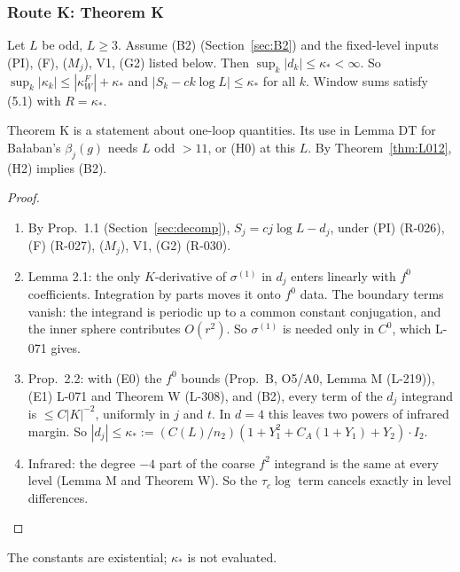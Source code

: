 \subsubsection{Route K: Theorem K}\label{sec:routeK}

\begin{theorem}[Theorem K]\label{thm:L009}
Let $L$ be odd, $L\ge3$. Assume (B2) (Section~\ref{sec:B2}) and the fixed-level inputs (PI), (F), ($M_j$), V1, (G2) listed below. Then $\sup_k|d_k|\le\kappa_*<\infty$. So $\sup_k|\kappa_k|\le|\kappa_W^F|+\kappa_*$ and $|S_k-ck\log L|\le\kappa_*$ for all $k$. Window sums satisfy (5.1) with $R=\kappa_*$.
\end{theorem}
Theorem K is a statement about one-loop quantities. Its use in Lemma DT for Ba{\l}aban's $\beta_j(g)$ needs $L$ odd $>11$, or (H0) at this $L$. By Theorem~\ref{thm:L012}, (H2) implies (B2).

\begin{proof}
\begin{enumerate}
\item By  Prop.\ 1.1 (Section~\ref{sec:decomp}), $S_j=cj\log L-d_j$, under (PI) (R-026), (F) (R-027), ($M_j$), V1, (G2) (R-030).
\item Lemma 2.1: the only $K$-derivative of $\sigma^{(1)}$ in $d_j$ enters linearly with $f^0$ coefficients. Integration by parts moves it onto $f^0$ data. The boundary terms vanish: the integrand is periodic up to a common constant conjugation, and the inner sphere contributes $O(r^2)$. So $\sigma^{(1)}$ is needed only in $C^0$, which L-071 gives.
\item Prop.\ 2.2: with (E0) the $f^0$ bounds (Prop.\ B, O5/A0, Lemma M (L-219)), (E1) L-071 and Theorem W (L-308), and (B2), every term of the $d_j$ integrand is $\le C|K|^{-2}$, uniformly in $j$ and $t$. In $d=4$ this leaves two powers of infrared margin. So $|d_j|\le\kappa_*:=(C(L)/n_2)(1+Y_1^2+C_A(1+Y_1)+Y_2)\cdot I_2$.
\item Infrared: the degree $-4$ part of the coarse $f^2$ integrand is the same at every level (Lemma M and Theorem W). So the $\tau_c\log$ term cancels exactly in level differences.\qedhere
\end{enumerate}
\end{proof}
The constants are existential; $\kappa_*$ is not evaluated.

